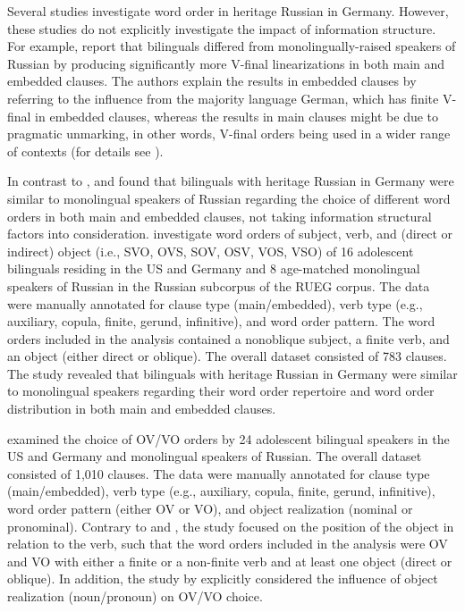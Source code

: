 \documentclass[output=paper,colorlinks,citecolor=brown]{langscibook}
\begin{document}
Several studies investigate word order in heritage Russian in Germany. However, these studies do not explicitly investigate the impact of information structure. For example, \citet{brehmer_lets_2015} report that bilinguals differed from monolingually-raised speakers of Russian by producing significantly more V-final linearizations in both main and embedded clauses. The authors explain the results in embedded clauses by referring to the influence from the majority language German, which has finite V-final in embedded clauses, whereas the results in main clauses might be due to pragmatic unmarking, in other words, V-final orders being used in a wider range of contexts (for details see \cite{brehmer_lets_2015}).

In contrast to \citet{brehmer_lets_2015}, \citet{zuban_word_2021} and \citet{martynova_ovvo_nodate} found that bilinguals with heritage Russian in Germany were similar to monolingual speakers of Russian regarding the choice of different word orders in both main and embedded clauses, not taking information structural factors into consideration. \citet{zuban_word_2021} investigate word orders of subject, verb, and (direct or indirect) object (i.e., SVO, OVS, SOV, OSV, VOS, VSO) of 16 adolescent bilinguals residing in the US and Germany and 8 age-matched monolingual speakers of Russian in the Russian subcorpus of the RUEG corpus. The data were manually annotated for clause type (main/embedded), verb type (e.g., auxiliary, copula, finite, gerund, infinitive), and word order pattern. The word orders included in the analysis contained a nonoblique subject, a finite verb, and an object (either direct or oblique). The overall dataset consisted of 783 clauses. The study revealed that bilinguals with heritage Russian in Germany were similar to monolingual speakers regarding their word order repertoire and word order distribution in both main and embedded clauses.

\citet{martynova_ovvo_nodate} examined the choice of OV/VO orders by 24 adolescent bilingual speakers in the US and Germany and monolingual speakers of Russian. The overall dataset consisted of 1,010 clauses. The data were manually annotated for clause type (main/embedded), verb type (e.g., auxiliary, copula, finite, gerund, infinitive), word order pattern (either OV or VO), and object realization (nominal or pronominal). Contrary to \citet{zuban_word_2021} and \citet{brehmer_lets_2015}, the study focused on the position of the object in relation to the verb, such that the word orders included in the analysis were OV and VO with either a finite or a non-finite verb and at least one object (direct or oblique). In addition, the study by \citet{martynova_ovvo_nodate} explicitly considered the influence of object realization (noun/pronoun) on OV/VO choice. 
\end{document}
